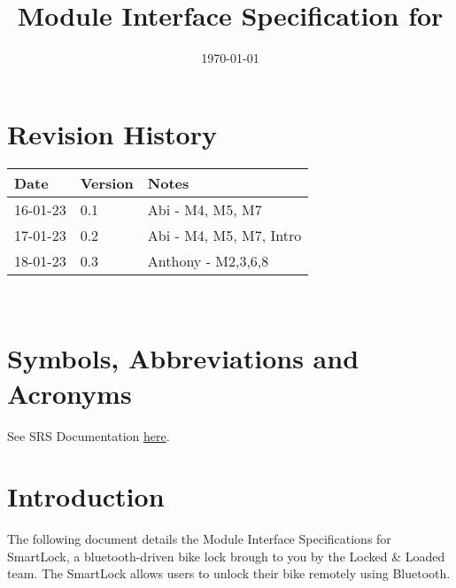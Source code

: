 \documentclass[12pt, titlepage]{article}
\begin{document}
\title{Module Interface Specification for \progname{}}

\author{\authname}

\date{\today}

\maketitle


\section{Revision History}

\begin{tabularx}{\textwidth}{p{3cm}p{2cm}X}
\toprule {\bf Date} & {\bf Version} & {\bf Notes}\\
\midrule
16-01-23 & 0.1 & Abi - M4, M5, M7\\
17-01-23  & 0.2 & Abi - M4, M5, M7, Intro\\
18-01-23 & 0.3 & Anthony - M2,3,6,8\\
\bottomrule
\end{tabularx}

~\newpage

\section{Symbols, Abbreviations and Acronyms}

See SRS Documentation \href{https://github.com/NevoAbigail/Capstone/blob/main/docs/SRS/SRS.pdf}{here}.


\newpage

\tableofcontents

\newpage


\section{Introduction}

The following document details the Module Interface Specifications for
SmartLock, a bluetooth-driven bike lock brough to you by the Locked \& Loaded team. The SmartLock allows users to unlock their bike remotely using Bluetooth. 

\end{document}
